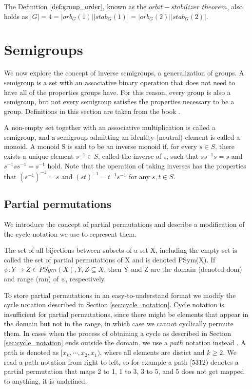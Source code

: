 The Definition $\ref{def:group_order}$, known as the $orbit-stabilizer$ $theorem$, also holds as $|G| = 4 = |orb_G(1)| |stab_G(1)| = |orb_G(2)| |stab_G(2)|$.

\section{Semigroups}
\label{sec:semigroups}

We now explore the concept of inverse semigroups, a generalization of groups. A semigroup is a set with an associative binary operation that does not need to have all of the properties groups have. For this reason, every group is also a semigroup, but not every semigroup satisfies the properties necessary to be a group. Definitions in this section are taken from the book \cite{law98}.

\begin{definition}
\label{semigroup_def}
A non-empty set together with an associative multiplication is called a semigroup, and a semigroup admitting an identity (neutral) element is called a monoid. A monoid S is said to be an inverse monoid if, for every $s \in S$, there exists a unique element $s^{-1} \in S$, called the inverse of s, such that $s s^{-1} s=s$ and $s^{-1} s s^{-1} = s^{-1}$ hold. Note that the operation of taking inverses has the properties that $(s^{-1})^{-1} = s$ and $(st)^{-1} = t^{-1} s^{-1}$ for any $s, t \in S$.
\end{definition}

\subsection{Partial permutations}
\label{sec:partial_permutation}

We introduce the concept of partial permutations and describe a modification of the cycle notation we use to represent them.

\begin{definition}
\label{def:partial_perm}
The set of all bijections between subsets of a set X, including the empty set is called the set of partial permutations of X and is denoted PSym(X). If $\psi : Y \to Z \in PSym(X), Y, Z \subseteq X$, then Y and Z are the domain (denoted dom) and range (ran) of $\psi$, respectively.
\end{definition}

To store partial permutations in an easy-to-understand format we modify the cycle notation described in Section \ref{sec:cycle_notation}. Cycle notation is insufficient for partial permutations, since there might be elements that appear in the domain but not in the range, in which case we cannot cyclically permute them. In cases when the process of obtaining a cycle as described in Section \ref{sec:cycle_notation} ends outside the domain, we use a $path$ notation instead \cite{jjss21}. A path is denoted as $[x_k, \cdots , x_2, x_1)$, where all elements are distict and $k \ge 2$. We read a path notation from right to left, so for example a path $[5312)$ denotes a partial permutation that maps 2 to 1, 1 to 3, 3 to 5, and 5 does not get mapped to anything, it is undefined.

